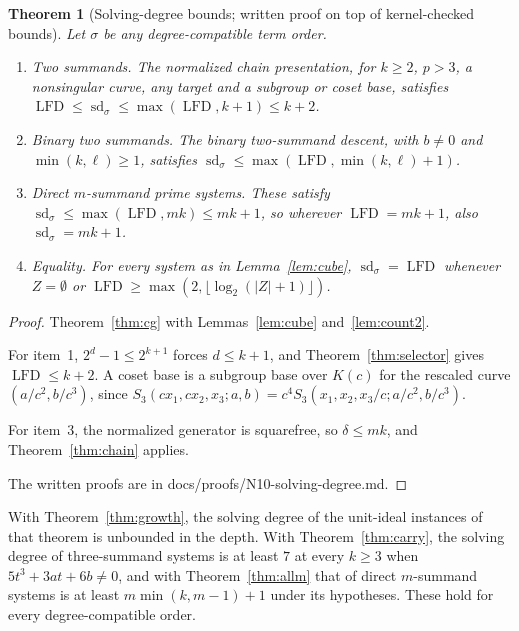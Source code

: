 \documentclass[11pt]{article}
\newtheorem{theorem}{Theorem}
\theoremstyle{definition}\newtheorem{definition}[theorem]{Definition}
\theoremstyle{remark}\newtheorem{remark}[theorem]{Remark}
\newcommand{\lfd}{\operatorname{LFD}}
\newcommand{\sd}{\operatorname{sd}}
\newcommand{\codeus}{\textunderscore\allowbreak}
\newcommand{\code}[1]{{\ttfamily\let\_\codeus#1}}
\begin{document}
\begin{theorem}[Solving-degree bounds; written proof on top of kernel-checked bounds]\label{thm:sd}
Let $\sigma$ be any degree-compatible term order.
\begin{enumerate}
\item \emph{Two summands.} The normalized chain presentation, for
 $k\ge2$, $p>3$, a nonsingular curve, any target and a subgroup or coset
 base, satisfies $\lfd\le\sd_\sigma\le\max(\lfd,k+1)\le k+2$.
\item \emph{Binary two summands.} The binary two-summand descent, with
 $b\ne0$ and $\min(k,\ell)\ge1$, satisfies
 $\sd_\sigma\le\max(\lfd,\min(k,\ell)+1)$.
\item \emph{Direct $m$-summand prime systems.} These satisfy
 $\sd_\sigma\le\max(\lfd,mk)\le mk+1$, so wherever $\lfd=mk+1$, also
 $\sd_\sigma=mk+1$.
\item \emph{Equality.} For every system as in Lemma~\ref{lem:cube}, $\sd_\sigma=\lfd$ whenever $Z=\emptyset$
 or $\lfd\ge\max(2,\lfloor\log_2(|Z|+1)\rfloor)$.
\end{enumerate}
\end{theorem}
\begin{proof}
Theorem~\ref{thm:cg} with Lemmas~\ref{lem:cube} and~\ref{lem:count2}.

For item~1, $2^d-1\le2^{k+1}$ forces $d\le k+1$, and
Theorem~\ref{thm:selector} gives $\lfd\le k+2$. A coset base is a subgroup
base over $K(c)$ for the rescaled curve $(a/c^2,b/c^3)$, since
$S_3(cx_1,cx_2,x_3;a,b)=c^4S_3(x_1,x_2,x_3/c;a/c^2,b/c^3)$.

For item~3, the normalized generator is squarefree, so $\delta\le mk$, and
Theorem~\ref{thm:chain} applies.

The written proofs are in
\code{docs/\allowbreak{}proofs/\allowbreak{}N10-solving-degree.md}.
\end{proof}

With Theorem~\ref{thm:growth}, the solving degree of the unit-ideal
instances of that theorem is unbounded in the depth. With
Theorem~\ref{thm:carry}, the solving degree of three-summand systems is at
least $7$ at every $k\ge3$ when $5t^3+3at+6b\ne0$, and with
Theorem~\ref{thm:allm} that of direct $m$-summand systems is at least
$m\min(k,m-1)+1$ under its hypotheses. These hold for every
degree-compatible order.
\end{document}
